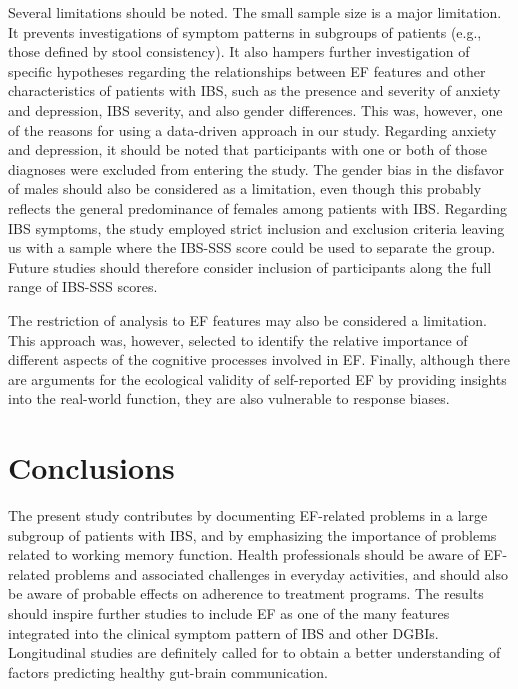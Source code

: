 \documentclass[jcm,article,submit,pdftex,moreauthors]{Definitions/mdpi}
\begin{document}
 Several limitations should be noted. The small sample size is a major limitation. It prevents investigations of symptom patterns in subgroups of patients (e.g., those defined by stool consistency). It also 
 hampers further investigation of specific hypotheses regarding the relationships between EF features and other characteristics of patients with IBS, such as the presence and severity of anxiety and depression, IBS severity, and also gender differences. This was, however, one of the reasons for using a data-driven approach in our study. Regarding anxiety and depression, it should be noted that participants with one or both of those diagnoses were excluded from entering the study. The gender bias in the disfavor of males should also be considered as a limitation, even though this probably reflects the general predominance of females among patients with IBS. Regarding IBS symptoms, the study employed strict inclusion and exclusion criteria leaving us with a sample where the IBS-SSS score could be used to separate the group. Future studies should therefore consider inclusion of participants along the full range of IBS-SSS scores.  

 The restriction of analysis to EF features may also be considered a limitation. This approach was, however, selected to identify the relative importance of different aspects of the cognitive processes involved in EF. Finally, although there are arguments for the ecological validity of self-reported EF by providing insights into the real-world function, they are also vulnerable to response biases. 


\section{Conclusions}

The present study contributes by documenting EF-related problems in a large subgroup of patients with IBS, and by emphasizing the importance of problems related to working memory function. Health professionals should be aware of EF-related problems and associated challenges in everyday activities, and should also be aware of probable effects on adherence to treatment programs. The results should inspire further studies to include EF as one of the many features integrated into the clinical symptom pattern of IBS and other DGBIs. Longitudinal studies are definitely called for to obtain a better understanding of factors predicting healthy gut-brain communication.
\end{document}
